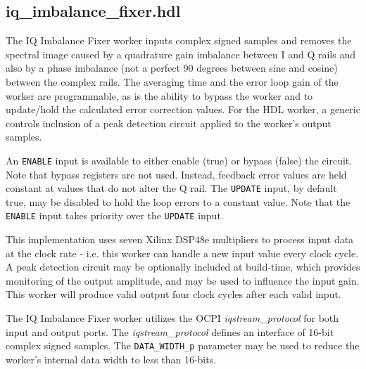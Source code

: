 \documentclass{article}
\def\comp{iq\_imbalance\_fixer}
\begin{document}
\subsection*{\comp.hdl}
\begin{flushleft}
	The IQ Imbalance Fixer worker inputs complex signed samples and removes the spectral image caused by a quadrature gain imbalance between I and Q rails and also by a phase imbalance (not a perfect 90 degrees between sine and cosine) between the complex rails. The averaging time and the error loop gain of the worker are programmable, as is the ability to bypass the worker and to update/hold the calculated error correction values. For the HDL worker, a generic controls inclusion of a peak detection circuit applied to the worker's output samples.\medskip

	An \verb+ENABLE+ input is available to either enable (true) or bypass (false) the circuit. Note that bypass registers are not used. Instead, feedback error values are held constant at values that do not alter the Q rail. The \verb+UPDATE+ input, by default true, may be disabled to hold the loop errors to a constant value. Note that the \verb+ENABLE+ input takes priority over the \verb+UPDATE+ input.\medskip

	This implementation uses seven Xilinx DSP48e multipliers to process input data at the clock rate - i.e. this worker can handle a new input value every clock cycle. A peak detection circuit may be optionally included at build-time, which provides monitoring of the output amplitude, and may be used to influence the input gain. This worker will produce valid output four clock cycles after each valid input.\medskip

	The IQ Imbalance Fixer worker utilizes the OCPI \textit{iqstream\_protocol} for both input and output ports. The \textit{iqstream\_protocol} defines an interface of 16-bit complex signed samples. The \verb+DATA_WIDTH_p+ parameter may be used to reduce the worker's internal data width to less than 16-bits.
\end{flushleft}
\end{document}
